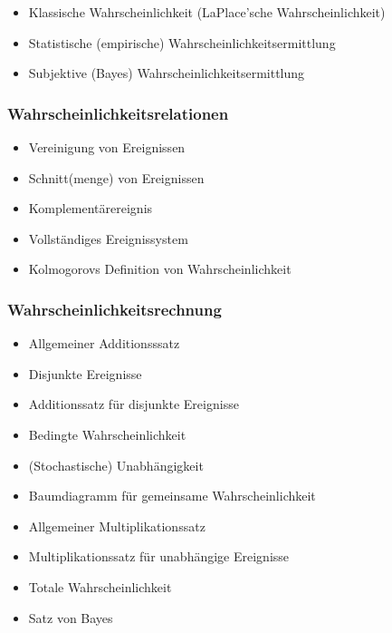 \documentclass[
  a4paper,
  DIV=11]{scrreprt}
\providecommand{\tightlist}{%
  \setlength{\itemsep}{0pt}\setlength{\parskip}{0pt}}\usepackage{longtable,booktabs,array}
\theoremstyle{definition}
\theoremstyle{remark}
\begin{document}
\begin{itemize}
\tightlist
\item
  Klassische Wahrscheinlichkeit (LaPlace'sche Wahrscheinlichkeit)
\item
  Statistische (empirische) Wahrscheinlichkeitsermittlung
\item
  Subjektive (Bayes) Wahrscheinlichkeitsermittlung
\end{itemize}

\hypertarget{wahrscheinlichkeitsrelationen}{%
\subsubsection{Wahrscheinlichkeitsrelationen}\label{wahrscheinlichkeitsrelationen}}

\begin{itemize}
\tightlist
\item
  Vereinigung von Ereignissen
\item
  Schnitt(menge) von Ereignissen
\item
  Komplementärereignis
\item
  Vollständiges Ereignissystem
\item
  Kolmogorovs Definition von Wahrscheinlichkeit
\end{itemize}

\hypertarget{wahrscheinlichkeitsrechnung}{%
\subsubsection{Wahrscheinlichkeitsrechnung}\label{wahrscheinlichkeitsrechnung}}

\begin{itemize}
\tightlist
\item
  Allgemeiner Additionsssatz
\item
  Disjunkte Ereignisse
\item
  Additionssatz für disjunkte Ereignisse
\item
  Bedingte Wahrscheinlichkeit
\item
  (Stochastische) Unabhängigkeit
\item
  Baumdiagramm für gemeinsame Wahrscheinlichkeit
\item
  Allgemeiner Multiplikationssatz
\item
  Multiplikationssatz für unabhängige Ereignisse
\item
  Totale Wahrscheinlichkeit
\item
  Satz von Bayes
\end{itemize}
\end{document}
